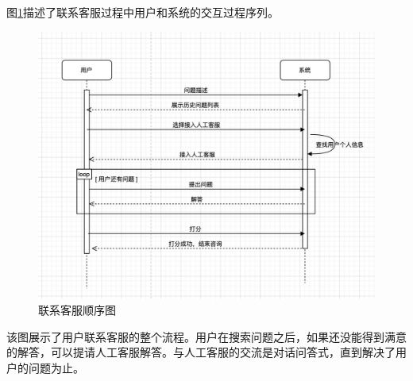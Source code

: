 \documentclass[a4paper]{ctexart}
\begin{document}
图\ref{fig:联系客服顺序图}描述了联系客服过程中用户和系统的交互过程序列。
\begin{figure}[H]
\centering
\includegraphics[scale=0.4]{image/1_4顺序图.png}
\caption{联系客服顺序图}
\label{fig:联系客服顺序图}
\end{figure}
该图展示了用户联系客服的整个流程。用户在搜索问题之后，如果还没能得到满意的解答，可以提请人工客服解答。与人工客服的交流是对话问答式，直到解决了用户的问题为止。\\
\end{document}
